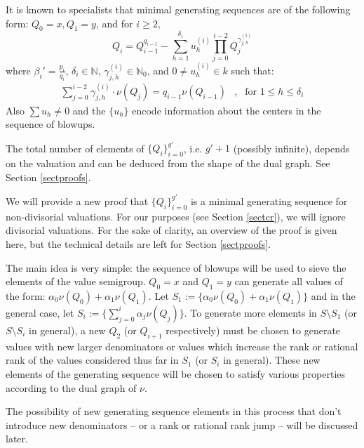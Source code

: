 \documentclass[11pt]{amsart}
\theoremstyle{definition}
\begin{document}
{It is known to specialists that minimal generating sequences are of the following form: $Q_0=x, Q_1=y$, and for $i\geq 2$,
\begin{equation}  \label{genrecur}
Q_i=Q_{i-1}^{q_{i-1}}-\sum_{h=1}^{\delta_i} u_h^{(i)} \prod_{j=0}^{i-2} Q_j^{\gamma_{j,h}^{(i)}}
\end{equation}
where $\displaystyle \beta_i'=\frac{p_i}{q_i}$, $\delta_i\in\mathbb{N}$, $\gamma_{j,h}^{(i)}\in\mathbb N_0$, and $0\neq u_h^{(i)}\in k$ such that:
\begin{equation*}
\begin{array}{lll}
\displaystyle \sum_{j=0}^{i-2} \gamma_{j,h}^{(i)}\cdot\nu(Q_j) = q_{i-1}\nu(Q_{i-1}) & , & \text{for } 1\leq h \leq \delta_i
\end{array}
\end{equation*}
Also $\sum u_h\neq 0$ and the $\{u_h\}$ encode information about the centers in the sequence of blowups.

The total number of elements of $\{Q_i\}_{i=0}^{g'}$, i.e. $g'+1$ (possibly infinite), depends on the valuation and can be deduced from the shape of the dual graph. See Section \ref{sectproofs}.

We will provide a new proof that $\{Q_i\}_{i=0}^{g'}$ is a minimal generating sequence for non-divisorial valuations. For our purposes (see Section \ref{sectcr}), we will ignore divisorial valuations. For the sake of clarity, an overview of the proof is given here, but the technical details are left for Section \ref{sectproofs}.

The main idea is very simple: the sequence of blowups will be used to sieve the elements of the value semigroup. $Q_0=x$ and $Q_1=y$ can generate all values of the form: $\displaystyle \alpha_0 \nu(Q_0)+\alpha_1\nu(Q_1)$. Let $S_1:=\{\alpha_0\nu(Q_0)+\alpha_1\nu(Q_1)\}$ and in the general case, let $S_i:=\{\sum_{j=0}^{i} \alpha_j\nu(Q_j)\}$. To generate more elements in $S\setminus S_1$ (or $S\setminus S_i$ in general), a new $Q_2$ (or $Q_{i+1}$ respectively) must be chosen to generate values with new larger denominators or values which increase the rank or rational rank of the values considered thus far in $S_1$ (or $S_i$ in general). These new elements of the generating sequence will be chosen to satisfy various properties according to the dual graph of $\nu$.

The possibility of new generating sequence elements in this process that don't introduce new denominators -- or a rank or rational rank jump -- will be discussed later.

}
\end{document}
